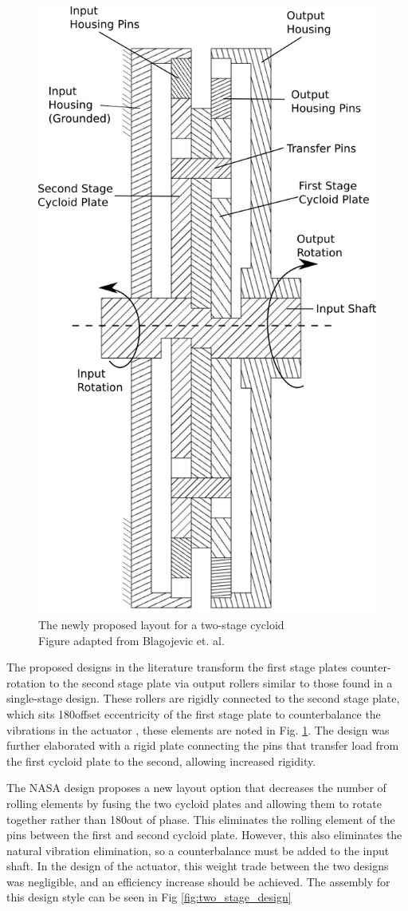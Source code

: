 \begin{figure}[h]
	\centering
	\includegraphics[width=0.48\linewidth]{fig/new_layout}
   \caption{The newly proposed layout for a two-stage cycloid
   \\Figure adapted from Blagojevic et. al. \cite{ref:new_two_stage}}
   \label{fig:two_stage_simple_cross}
\end{figure}

The proposed designs in the literature transform the first stage plates counter-rotation to the second stage plate via output rollers similar to those found in a single-stage design. These rollers are rigidly connected to the second stage plate, which sits 180\textdegree offset eccentricity of the first stage plate to counterbalance the vibrations in the actuator \cite{ref:new_two_stage}, these elements are noted in Fig. \ref{fig:two_stage_simple_cross}. The design was further elaborated with a rigid plate connecting the pins that transfer load from the first cycloid plate to the second, allowing increased rigidity. 

The NASA design proposes a new layout option that decreases the number of rolling elements by fusing the two cycloid plates and allowing them to rotate together rather than 180\textdegree out of phase. This eliminates the rolling element of the pins between the first and second cycloid plate. However, this also eliminates the natural vibration elimination, so a counterbalance must be added to the input shaft. In the design of the actuator, this weight trade between the two designs was negligible, and an efficiency increase should be achieved. The assembly for this design style can be seen in Fig \ref{fig:two_stage_design} 

